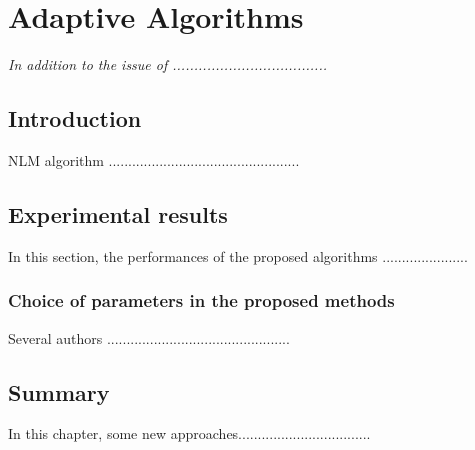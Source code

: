 \chapter{Adaptive Algorithms}
\label{C4} %
\graphicspath{{Figures/Chapter-4figs/PDF/}{Figures/Chapter-4figs/}}
\textit{In addition to the issue of ....................................}
\section{Introduction} \label{S4.1}
NLM algorithm \cite{deadd}.................................................
\section{Experimental results} \label{S4.6}
In this section, the performances of the proposed algorithms ......................
\subsection{Choice of parameters in the proposed methods}
Several authors ...............................................

\section{Summary} 
In this chapter, some new approaches..................................
